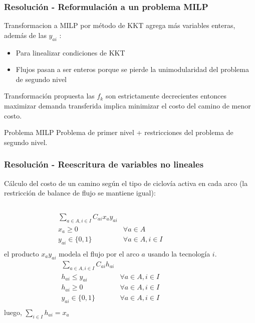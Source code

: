 \documentclass[aspectratio=43, 10pt]{beamer}
\begin{document}
\begin{frame}
    \frametitle{Resolución - Reformulación a un problema MILP}

    Transformacion a MILP por método de KKT agrega más variables enteras, además de las $y_{ai}$ \parencite{kara2004}:
    \begin{itemize}
    \item{Para linealizar condiciones de KKT}
    \item{Flujos pasan a ser enteros porque se pierde la unimodularidad del problema de segundo nivel}
    \end{itemize}

    \vspace{10pt}

    \begin{block}{Transformación propuesta}
        las $f_k$ son estrictamente decrecientes entonces maximizar demanda transferida implica minimizar el costo del camino de menor costo.
    \end{block}
    \vspace{10pt}

    \begin{block}{Problema MILP}
        Problema de primer nivel + restricciones del problema de segundo nivel.
    \end{block}
\end{frame}

\begin{frame}
    \frametitle{Resolución - Reescritura de variables no lineales}
    Cálculo del costo de un camino según el tipo de ciclovía activa en cada arco (la restricción de balance de flujo se mantiene igual):

    \begin{columns}[c]
            \begin{eqnarray*}
              \sum_{a \in A, i \in I} C_{ai} x_a y_{ai} \\
              x_a \geq 0 & \forall a \in A \\
              y_{ai} \in \{0,1\} & \forall a \in A, i \in I \\
            \end{eqnarray*}
            el producto $x_a y_{ai}$ modela el flujo por el arco $a$ usando la
            tecnología $i$.
            \begin{eqnarray*}
              \sum_{a \in A, i \in I} C_{ai} h_{ai} & \\
              h_{ai} \leq y_{ai} & \forall a \in A, i \in I \\
              h_{ai} \geq 0 & \forall a \in A, i \in I \\
              y_{ai} \in \{0,1\} & \forall a \in A, i \in I \\
            \end{eqnarray*}
            luego, $\sum_{i \in I} h_{ai} = x_{a}$
    \end{columns}
\end{frame}
\end{document}
